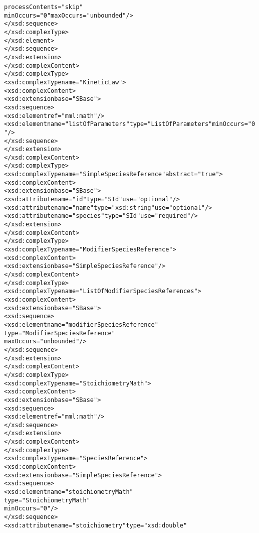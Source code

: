 \begin{alltt}
                                         processContents="skip" 
                                         minOccurs="0" maxOccurs="unbounded"/>
                            </xsd:sequence>
                        </xsd:complexType>
                    </xsd:element>
                </xsd:sequence>
            </xsd:extension>
        </xsd:complexContent>
    </xsd:complexType>
    <xsd:complexType name="KineticLaw">
        <xsd:complexContent>
            <xsd:extension base="SBase">
                <xsd:sequence>
                    <xsd:element ref="mml:math"/>
                    <xsd:element name="listOfParameters" type="ListOfParameters" minOccurs="0"/>
                </xsd:sequence>
            </xsd:extension>
        </xsd:complexContent>
    </xsd:complexType>
    <xsd:complexType name="SimpleSpeciesReference" abstract="true">
        <xsd:complexContent>
            <xsd:extension base="SBase">
                <xsd:attribute name="id" type="SId" use="optional"/>
                <xsd:attribute name="name" type="xsd:string" use="optional"/>
                <xsd:attribute name="species" type="SId" use="required"/>
            </xsd:extension>
        </xsd:complexContent>
    </xsd:complexType>
    <xsd:complexType name="ModifierSpeciesReference">
        <xsd:complexContent>
            <xsd:extension base="SimpleSpeciesReference"/>
        </xsd:complexContent>
    </xsd:complexType>
    <xsd:complexType name="ListOfModifierSpeciesReferences">
        <xsd:complexContent>
            <xsd:extension base="SBase">
                <xsd:sequence>
                    <xsd:element name="modifierSpeciesReference" 
                                 type="ModifierSpeciesReference" 
                                 maxOccurs="unbounded"/>
                </xsd:sequence>
            </xsd:extension>
        </xsd:complexContent>
    </xsd:complexType>
    <xsd:complexType name="StoichiometryMath">
        <xsd:complexContent>
            <xsd:extension base="SBase">
                <xsd:sequence>
                    <xsd:element ref="mml:math"/>
                </xsd:sequence>
            </xsd:extension>
        </xsd:complexContent>
    </xsd:complexType>
    <xsd:complexType name="SpeciesReference">
        <xsd:complexContent>
            <xsd:extension base="SimpleSpeciesReference">
                <xsd:sequence>
                    <xsd:element name="stoichiometryMath" 
                                 type="StoichiometryMath" 
                                 minOccurs="0"/>
                </xsd:sequence>
                <xsd:attribute name="stoichiometry" type="xsd:double" 

\end{alltt}
